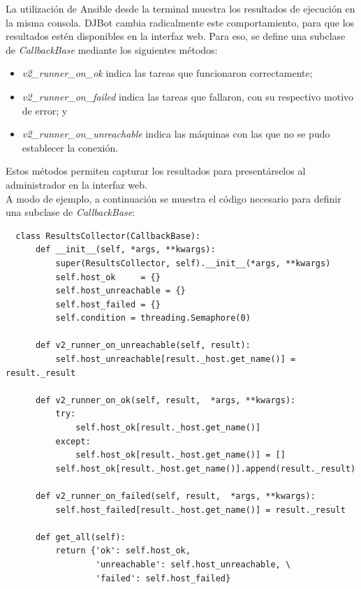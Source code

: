 \documentclass[a4paper,12pt]{article}
\begin{document}
La utilización de Ansible desde la terminal muestra los resultados de ejecución en la misma consola. DJBot cambia radicalmente este comportamiento, para que los resultados estén disponibles en la interfaz web. Para eso, se define una subclase de \emph{CallbackBase} mediante los siguientes métodos:\\
\begin{itemize}
\item \emph{v2\_runner\_on\_ok} indica las tareas que funcionaron correctamente;\\
\item \emph{v2\_runner\_on\_failed} indica las tareas que fallaron, con su respectivo motivo de error; y\\
\item \emph{v2\_runner\_on\_unreachable} indica las máquinas con las que no se pudo establecer la conexión.\\
\end{itemize}
Estos métodos permiten capturar los resultados para presentárselos al administrador en la interfaz web.\\

A modo de ejemplo, a continuación se muestra el código necesario para definir una subclase de \emph{CallbackBase}:\\
\begin{verbatim}
  class ResultsCollector(CallbackBase):
      def __init__(self, *args, **kwargs):
          super(ResultsCollector, self).__init__(*args, **kwargs)
          self.host_ok     = {}
          self.host_unreachable = {}
          self.host_failed = {}
          self.condition = threading.Semaphore(0)
    
      def v2_runner_on_unreachable(self, result):
          self.host_unreachable[result._host.get_name()] = result._result
      
      def v2_runner_on_ok(self, result,  *args, **kwargs):
          try:
              self.host_ok[result._host.get_name()]
          except:
              self.host_ok[result._host.get_name()] = []
          self.host_ok[result._host.get_name()].append(result._result)

      def v2_runner_on_failed(self, result,  *args, **kwargs):
          self.host_failed[result._host.get_name()] = result._result

      def get_all(self):
          return {'ok': self.host_ok,
                  'unreachable': self.host_unreachable, \
                  'failed': self.host_failed}
\end{verbatim}
\end{document}
